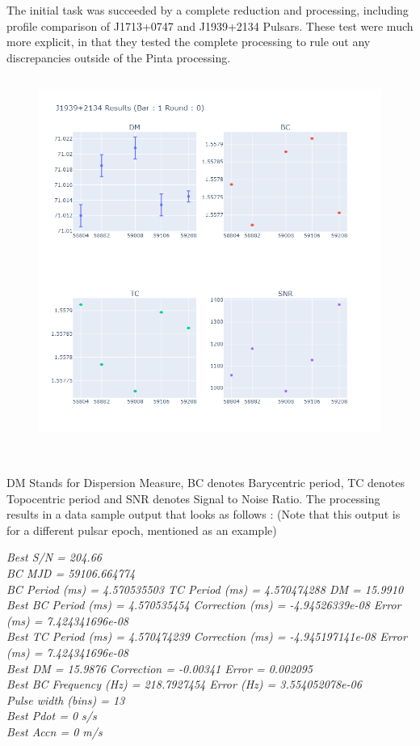 \documentclass{article}
\begin{document}
\clearpage
\newpage
The initial task was succeeded by a complete reduction and processing, including profile comparison of J1713+0747 and J1939+2134 Pulsars. These test were much more explicit, in that they tested the complete processing to rule out any discrepancies outside of the Pinta processing. \\
\begin{figure}[htbp]
\begin{center}
\includegraphics[height=12cm,width=14cm]{Images/Pulsar14.png}\\
\end{center}
\end{figure}
\\ DM Stands for Dispersion Measure, BC denotes Barycentric period, TC denotes Topocentric period and SNR denotes Signal to Noise Ratio. The processing results in a data sample output that looks as follows : (Note that this output is for a different pulsar epoch, mentioned as an example)

\begin{displayquote}
{\small \textsl{Best S/N = 204.66\\
BC MJD = 59106.664774\\
BC Period (ms) = 4.570535503  TC Period (ms) =  4.570474288  DM =   15.9910\\
Best BC Period (ms) = 4.570535454  Correction (ms) = -4.94526339e-08  Error (ms) = 7.424341696e-08\\
Best TC Period (ms) = 4.570474239  Correction (ms) = -4.945197141e-08  Error (ms) = 7.424341696e-08\\
Best DM =   15.9876  Correction = -0.00341  Error = 0.002095\\
Best BC Frequency (Hz) = 218.7927454  Error (Hz) = 3.554052078e-06\\
Pulse width (bins) = 13\\
Best Pdot =   0 s/s\\
Best Accn =   0 m/s\\}}
\end{displayquote}
\end{document}
